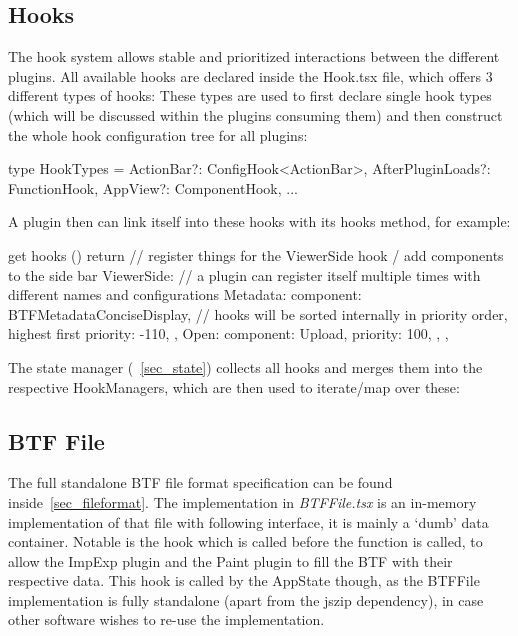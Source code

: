 \subsection{Hooks}\label{sec_hooks}
The hook system allows stable and prioritized interactions between the different
plugins. All available hooks are declared inside the {Hook.tsx} file, which
offers 3 different types of hooks:
These types are used to first declare single hook types (which will be discussed
within the plugins consuming them) and then construct the whole hook
configuration tree for all plugins:
\begin{typescript}
type HookTypes = {
  ActionBar?: ConfigHook<ActionBar>,
  AfterPluginLoads?: FunctionHook,
  AppView?: ComponentHook,
...
}
\end{typescript}
A plugin then can link itself into these hooks with its hooks method, for
example:
\begin{typescript}
get hooks () {
  return {
    // register things for the ViewerSide hook / add components to the side bar
    ViewerSide: {
      // a plugin can register itself multiple times with different names and configurations
      Metadata: {
        component: BTFMetadataConciseDisplay,
        // hooks will be sorted internally in priority order, highest first
        priority: -110,
      },
      Open: {
        component: Upload,
        priority: 100,
      },
    },
  }
}
\end{typescript}
The state manager (~\autoref{sec_state}) collects all hooks and merges them into
the respective HookManagers, which are then used to iterate/map over these:


\subsection{BTF File}\label{sec_btffile}
The full standalone BTF file format specification can be found inside~\autoref{sec_fileformat}.
The implementation in \emph{BTFFile.tsx} is an in-memory implementation of that
file with following interface, it is mainly a `dumb' data container.
Notable is the  hook which is called before the
 function is called, to allow the ImpExp plugin and the Paint
plugin to fill the BTF with their respective data. This hook is called by the
AppState though, as the BTFFile implementation is fully standalone (apart from
the jszip dependency), in case other software wishes to re-use the implementation.


